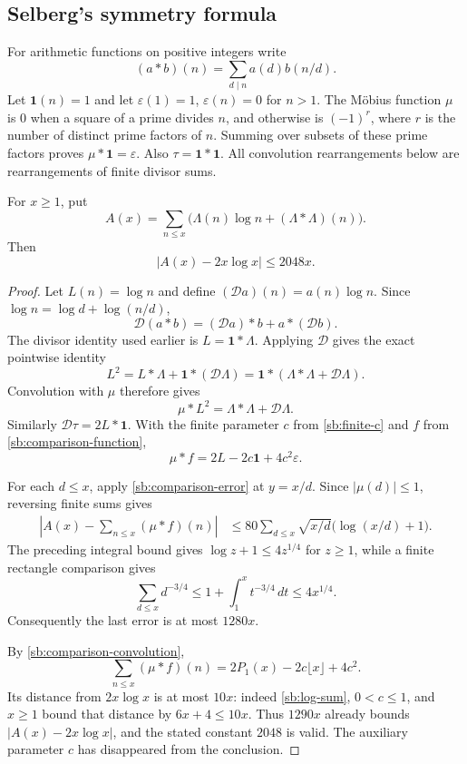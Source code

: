\subsection{Selberg's symmetry formula}
\label{sb:symmetry-subsection}

For arithmetic functions on positive integers write
\[
 (a*b)(n)=\sum_{d\mid n}a(d)b(n/d).
\]
Let $\mathbf1(n)=1$ and let $\varepsilon(1)=1$,
$\varepsilon(n)=0$ for $n>1$.  The M\"obius function $\mu$ is $0$
when a square of a prime divides $n$, and otherwise is $(-1)^r$,
where $r$ is the number of distinct prime factors of $n$.
Summing over subsets of these prime factors proves
$\mu*\mathbf1=\varepsilon$.  Also
$\tau=\mathbf1*\mathbf1$.  All convolution rearrangements below are
rearrangements of finite divisor sums.

\begin{lemma}
\label{sb:symmetry}
For $x\ge1$, put
\[
 A(x)=\sum_{n\le x}\bigl(\Lambda(n)\log n+(\Lambda*\Lambda)(n)\bigr).
\]
Then
\begin{equation}
 |A(x)-2x\log x|\le2048x.
 \label{sb:symmetry-bound}
\end{equation}
\end{lemma}

\begin{proof}
Let $L(n)=\log n$ and define $(\mathcal Da)(n)=a(n)\log n$.
Since $\log n=\log d+\log(n/d)$,
\[
 \mathcal D(a*b)=(\mathcal Da)*b+a*(\mathcal Db).
\]
The divisor identity used earlier is $L=\mathbf1*\Lambda$.  Applying
$\mathcal D$ gives the exact pointwise identity
\[
 L^2=L*\Lambda+\mathbf1*(\mathcal D\Lambda)
     =\mathbf1*(\Lambda*\Lambda+\mathcal D\Lambda).
\]
Convolution with $\mu$ therefore gives
\begin{equation}
 \mu*L^2=\Lambda*\Lambda+\mathcal D\Lambda.
 \label{sb:exact-symmetry}
\end{equation}
Similarly $\mathcal D\tau=2L*\mathbf1$.  With the finite parameter
$c$ from \eqref{sb:finite-c} and $f$ from
\eqref{sb:comparison-function},
\begin{equation}
 \mu*f=2L-2c\mathbf1+4c^2\varepsilon.
 \label{sb:comparison-convolution}
\end{equation}

For each $d\le x$, apply \eqref{sb:comparison-error} at $y=x/d$.
Since $|\mu(d)|\le1$, reversing finite sums gives
\begin{align*}
 \left|A(x)-\sum_{n\le x}(\mu*f)(n)\right|
 &\le80\sum_{d\le x}\sqrt{x/d}\bigl(\log(x/d)+1\bigr).
\end{align*}
The preceding integral bound gives
$\log z+1\le4z^{1/4}$ for $z\ge1$, while a finite rectangle
comparison gives
\[
 \sum_{d\le x}d^{-3/4}
       \le1+\int_1^x t^{-3/4}\,dt\le4x^{1/4}.
\]
Consequently the last error is at most $1280x$.

By \eqref{sb:comparison-convolution},
\[
 \sum_{n\le x}(\mu*f)(n)=2P_1(x)-2c\lfloor x\rfloor+4c^2.
\]
Its distance from $2x\log x$ is at most $10x$: indeed
\eqref{sb:log-sum}, $0<c\le1$, and $x\ge1$ bound that distance by
$6x+4\le10x$.  Thus $1290x$ already bounds
$|A(x)-2x\log x|$, and the stated constant $2048$ is valid.
The auxiliary parameter $c$ has disappeared from the conclusion.
\end{proof}

